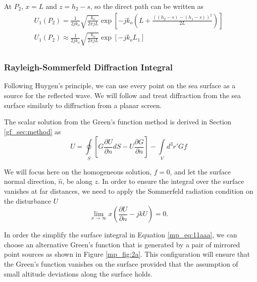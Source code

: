 At $P_2$, $x = L$ and $z = h_2-s$, so the direct path can be written as
\begin{equation}
\begin{gathered}
U_1(P_2) = \frac{1}{2jk_o}\sqrt{\frac{k_o}{2\pi jL}}\exp\left[-jk_o\left(L + \frac{((h_2-s)-(h_1-s))^2}{2L}\right) \right]\\
U_1(P_2)\approx \frac{1}{2jk_o} \sqrt{\frac{k_o}{2\pi jL}}\exp\left[-jk_oL_1 \right]\\
\end{gathered}
\label{mp_eq:11ac}
\end{equation}
\renewcommand{\baselinestretch}{2} \small\normalsize

\subsubsection{Rayleigh-Sommerfeld Diffraction Integral}
Following Huygen's principle, we can use every point on the sea surface as a source for the reflected wave. We will follow \cite{goodman_fourier} and treat diffraction from the sea surface similarly to diffraction from a planar screen. 

The scalar solution from the Green's function method is derived in Section \ref{gf_sec:method} as
\begin{equation}
U = \oint\limits_{S}\left[G\frac{\partial U}{\partial n}dS - U\frac{\partial G}{\partial n} \right] -\int\limits_{V}d^3r' Gf
\label{mp_eq:11aaa}
\end{equation}
\renewcommand{\baselinestretch}{2} \small\normalsize

We will focus here on the homogeneous solution, $f=0$, and let the surface normal direction, $\hat{n}$, be along $z$. In order to ensure the integral over the surface vanishes at far distances, we need to apply the Sommerfeld radiation condition on the disturbance $U$
\begin{equation}
 \lim_{x\to\infty} x\left(\frac{\partial U}{\partial n} -jkU \right) = 0.
\label{mp_eq:11aaaa}
\end{equation}
\renewcommand{\baselinestretch}{2} \small\normalsize

In order the simplify the surface integral in Equation \ref{mp_eq:11aaa}, we can choose an alternative Green's function that is generated by a pair of mirrored point sources as shown in Figure \ref{mp_fig:2a}. This configuration will ensure that the Green's function vanishes on the surface provided that the assumption of small altitude deviations along the surface holds.

